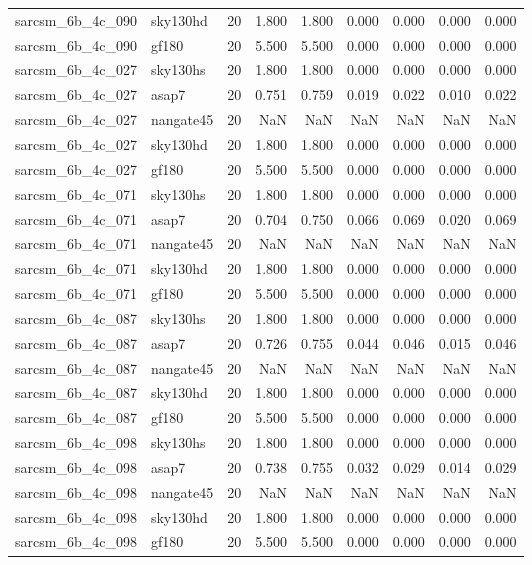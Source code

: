 \begin{tabular}{llrrrrrrr}
sarcsm\_6b\_4c\_090 & sky130hd & 20 & 1.800 & 1.800 & 0.000 & 0.000 & 0.000 & 0.000 \\
sarcsm\_6b\_4c\_090 & gf180 & 20 & 5.500 & 5.500 & 0.000 & 0.000 & 0.000 & 0.000 \\
sarcsm\_6b\_4c\_027 & sky130hs & 20 & 1.800 & 1.800 & 0.000 & 0.000 & 0.000 & 0.000 \\
sarcsm\_6b\_4c\_027 & asap7 & 20 & 0.751 & 0.759 & 0.019 & 0.022 & 0.010 & 0.022 \\
sarcsm\_6b\_4c\_027 & nangate45 & 20 & NaN & NaN & NaN & NaN & NaN & NaN \\
sarcsm\_6b\_4c\_027 & sky130hd & 20 & 1.800 & 1.800 & 0.000 & 0.000 & 0.000 & 0.000 \\
sarcsm\_6b\_4c\_027 & gf180 & 20 & 5.500 & 5.500 & 0.000 & 0.000 & 0.000 & 0.000 \\
sarcsm\_6b\_4c\_071 & sky130hs & 20 & 1.800 & 1.800 & 0.000 & 0.000 & 0.000 & 0.000 \\
sarcsm\_6b\_4c\_071 & asap7 & 20 & 0.704 & 0.750 & 0.066 & 0.069 & 0.020 & 0.069 \\
sarcsm\_6b\_4c\_071 & nangate45 & 20 & NaN & NaN & NaN & NaN & NaN & NaN \\
sarcsm\_6b\_4c\_071 & sky130hd & 20 & 1.800 & 1.800 & 0.000 & 0.000 & 0.000 & 0.000 \\
sarcsm\_6b\_4c\_071 & gf180 & 20 & 5.500 & 5.500 & 0.000 & 0.000 & 0.000 & 0.000 \\
sarcsm\_6b\_4c\_087 & sky130hs & 20 & 1.800 & 1.800 & 0.000 & 0.000 & 0.000 & 0.000 \\
sarcsm\_6b\_4c\_087 & asap7 & 20 & 0.726 & 0.755 & 0.044 & 0.046 & 0.015 & 0.046 \\
sarcsm\_6b\_4c\_087 & nangate45 & 20 & NaN & NaN & NaN & NaN & NaN & NaN \\
sarcsm\_6b\_4c\_087 & sky130hd & 20 & 1.800 & 1.800 & 0.000 & 0.000 & 0.000 & 0.000 \\
sarcsm\_6b\_4c\_087 & gf180 & 20 & 5.500 & 5.500 & 0.000 & 0.000 & 0.000 & 0.000 \\
sarcsm\_6b\_4c\_098 & sky130hs & 20 & 1.800 & 1.800 & 0.000 & 0.000 & 0.000 & 0.000 \\
sarcsm\_6b\_4c\_098 & asap7 & 20 & 0.738 & 0.755 & 0.032 & 0.029 & 0.014 & 0.029 \\
sarcsm\_6b\_4c\_098 & nangate45 & 20 & NaN & NaN & NaN & NaN & NaN & NaN \\
sarcsm\_6b\_4c\_098 & sky130hd & 20 & 1.800 & 1.800 & 0.000 & 0.000 & 0.000 & 0.000 \\
sarcsm\_6b\_4c\_098 & gf180 & 20 & 5.500 & 5.500 & 0.000 & 0.000 & 0.000 & 0.000 \\

\end{tabular}
